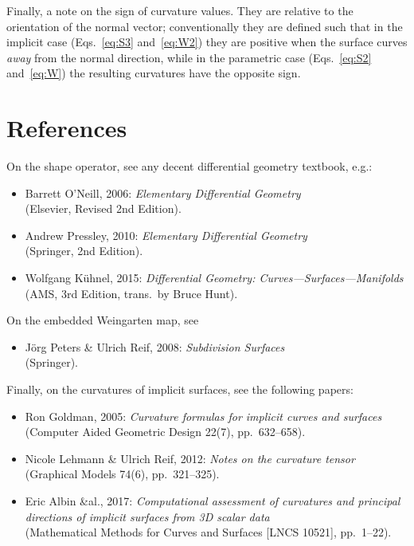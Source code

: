 \documentclass[a4paper]{article}
\begin{document}
Finally, a note on the sign of curvature values.
They are relative to the orientation of the normal vector;
conventionally they are defined such that in the implicit case
(Eqs.~\ref{eq:S3} and~\ref{eq:W2}) they
are positive when the surface curves \emph{away} from the normal direction,
while in the parametric case (Eqs.~\ref{eq:S2} and~\ref{eq:W})
the resulting curvatures have the opposite sign.

\section*{References}
On the shape operator, see any decent differential geometry textbook, e.g.:
\begin{itemize}
\item Barrett O'Neill, 2006:
  \emph{Elementary Differential Geometry}\\
  (Elsevier, Revised 2nd Edition).
\item Andrew Pressley, 2010:
  \emph{Elementary Differential Geometry}\\
  (Springer, 2nd Edition).
\item Wolfgang K\"uhnel, 2015:
  \emph{Differential Geometry: Curves---Surfaces---Manifolds}\\
  (AMS, 3rd Edition, trans.~by Bruce Hunt).
\end{itemize}
On the embedded Weingarten map, see
\begin{itemize}
\item J\"org Peters \& Ulrich Reif, 2008:
  \emph{Subdivision Surfaces}\\
  (Springer).
\end{itemize}
Finally, on the curvatures of implicit surfaces, see the following papers:
\begin{itemize}
\item Ron Goldman, 2005:
  \emph{Curvature formulas for implicit curves and surfaces}\\
  (Computer Aided Geometric Design 22(7), pp.~632--658).
\item Nicole Lehmann \& Ulrich Reif, 2012:
  \emph{Notes on the curvature tensor}\\
  (Graphical Models 74(6), pp.~321--325).
\item Eric Albin \&al., 2017:
  \emph{Computational assessment of curvatures and principal directions of implicit surfaces from 3D scalar data}\\
  (Mathematical Methods for Curves and Surfaces [LNCS 10521], pp.~1--22).
\end{itemize}
\end{document}

